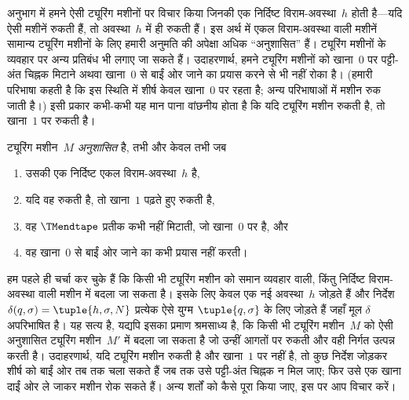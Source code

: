 \documentclass[../../../include/open-logic-section]{subfiles}
\begin{document}

\begin{explain}
अनुभाग  में हमने ऐसी ट्यूरिंग मशीनों पर विचार किया जिनकी
एक निर्दिष्ट विराम-अवस्था~$h$ होती है---यदि ऐसी मशीनें रुकती हैं, तो
अवस्था~$h$ में ही रुकती हैं। इस अर्थ में एकल विराम-अवस्था वाली मशीनें
सामान्य ट्यूरिंग मशीनों के लिए हमारी अनुमति की अपेक्षा अधिक
``अनुशासित'' हैं। ट्यूरिंग मशीनों के व्यवहार पर अन्य प्रतिबंध भी लगाए
जा सकते हैं। उदाहरणार्थ, हमने ट्यूरिंग मशीनों को खाना~$0$ पर पट्टी-अंत
चिह्नक मिटाने अथवा खाना~$0$ से बाईं ओर जाने का प्रयास करने से भी नहीं
रोका है। (हमारी परिभाषा कहती है कि इस स्थिति में शीर्ष केवल खाना~$0$ पर
रहता है; अन्य परिभाषाओं में मशीन रुक जाती है।) इसी प्रकार कभी-कभी यह
मान पाना वांछनीय होता है कि यदि ट्यूरिंग मशीन रुकती है, तो खाना~$1$ पर
रुकती है।
\end{explain}

\begin{defn}
ट्यूरिंग मशीन~$M$ \emph{अनुशासित} है, तभी और केवल तभी जब
\begin{enumerate}
    \item उसकी एक निर्दिष्ट एकल विराम-अवस्था~$h$ है,
    \item यदि वह रुकती है, तो खाना~$1$ पढ़ते हुए रुकती है,
    \item वह $\TMendtape$ प्रतीक कभी नहीं मिटाती, जो खाना~$0$ पर है, और
    \item वह खाना~$0$ से बाईं ओर जाने का कभी प्रयास नहीं करती।
\end{enumerate}
\end{defn}

\begin{explain}
हम पहले ही चर्चा कर चुके हैं कि किसी भी ट्यूरिंग मशीन को समान व्यवहार
वाली, किंतु निर्दिष्ट विराम-अवस्था वाली मशीन में बदला जा सकता है। इसके
लिए केवल एक नई अवस्था~$h$ जोड़ते हैं और निर्देश $\delta(q, \sigma) = \tuple{h, \sigma, N}$
प्रत्येक ऐसे युग्म $\tuple{q,\sigma}$ के लिए
जोड़ते हैं जहाँ मूल $\delta$ अपरिभाषित है। यह सत्य
है, यद्यपि इसका प्रमाण श्रमसाध्य है, कि किसी भी ट्यूरिंग मशीन~$M$ को ऐसी
अनुशासित ट्यूरिंग मशीन~$M'$ में बदला जा सकता है जो उन्हीं आगतों पर रुकती
और वही निर्गत उत्पन्न करती है। उदाहरणार्थ, यदि ट्यूरिंग मशीन रुकती है और
खाना~$1$ पर नहीं है, तो कुछ निर्देश जोड़कर शीर्ष को बाईं ओर तब तक चला
सकते हैं जब तक उसे पट्टी-अंत चिह्नक न मिल जाए; फिर उसे एक खाना दाईं ओर
ले जाकर मशीन रोक सकते हैं। अन्य शर्तों को कैसे पूरा किया जाए, इस पर आप
विचार करें।
\end{explain}
\end{document}
